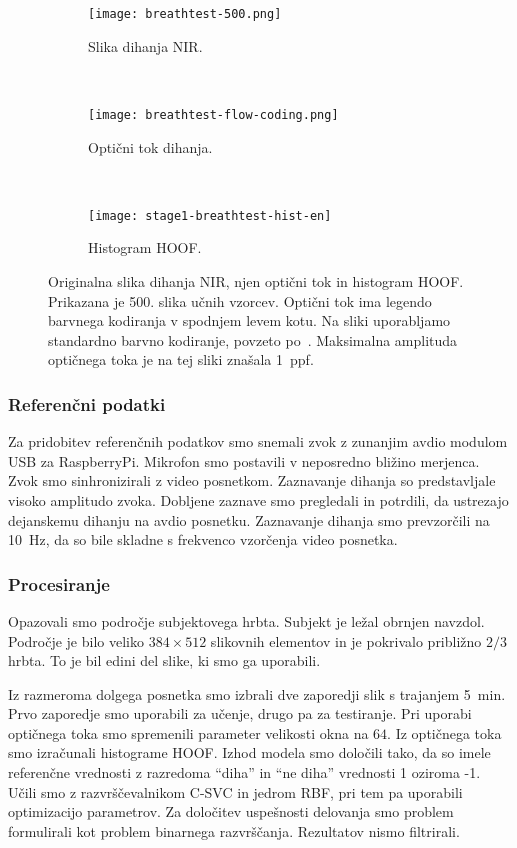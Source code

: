 \begin{figure}[htb]
	\centering
	\begin{subfigure}[t]{0.3\columnwidth}
		\centering
		\texttt{[image: breathtest-500.png]}
		\caption{Slika dihanja NIR.}
		\label{fig:dihanje-orig}
	\end{subfigure}
	~
	\begin{subfigure}[t]{0.3\columnwidth}
		\centering
		\texttt{[image: breathtest-flow-coding.png]}
		\caption{Optični tok dihanja.}
		\label{fig:dihanje-of}
	\end{subfigure}
	~
	\begin{subfigure}[t]{0.3\columnwidth}
		\centering
		\texttt{[image: stage1-breathtest-hist-en]}
		\caption{Histogram HOOF.}
		\label{fig:dihanje-hist}
	\end{subfigure}
	\caption[Originalna slika dihanja NIR, njen optični tok in histogram HOOF]{Originalna slika dihanja NIR, njen optični tok in histogram HOOF. Prikazana je 500. slika učnih vzorcev. Optični tok ima legendo barvnega kodiranja v spodnjem levem kotu. Na sliki uporabljamo standardno barvno kodiranje, povzeto po~\cite{baker2011database}. Maksimalna amplituda optičnega toka je na tej sliki znašala \SI{1}{ppf}.}
	\label{fig:dihanje}
\end{figure} 

\subsubsection{Referenčni podatki}
Za pridobitev referenčnih podatkov smo snemali zvok z zunanjim avdio modulom USB za RaspberryPi. Mikrofon smo postavili v neposredno bližino merjenca. Zvok smo sinhronizirali z video posnetkom. Zaznavanje dihanja so predstavljale visoko amplitudo zvoka. Dobljene zaznave smo pregledali in potrdili, da ustrezajo dejanskemu dihanju na avdio posnetku. Zaznavanje dihanja smo prevzorčili na \SI{10}{Hz}, da so bile skladne s frekvenco vzorčenja video posnetka.

\subsubsection{Procesiranje}\label{sec:data-preprocessing}
Opazovali smo področje subjektovega hrbta. Subjekt je ležal obrnjen navzdol. Področje je bilo veliko $384 \times 512$ slikovnih elementov in je pokrivalo približno $2/3$ hrbta. To je bil edini del slike, ki smo ga uporabili.

Iz razmeroma dolgega posnetka smo izbrali dve zaporedji slik s trajanjem \SI{5}{min}. Prvo zaporedje smo uporabili za učenje, drugo pa za testiranje. Pri uporabi optičnega toka smo spremenili parameter velikosti okna na $64$. Iz optičnega toka smo izračunali histograme HOOF. Izhod modela smo določili tako, da so imele referenčne vrednosti z razredoma ``diha'' in ``ne diha'' vrednosti 1 oziroma -1. Učili smo z razvrščevalnikom C-SVC in jedrom RBF, pri tem pa uporabili optimizacijo parametrov. Za določitev uspešnosti delovanja smo problem formulirali kot problem binarnega razvrščanja. Rezultatov nismo filtrirali.

